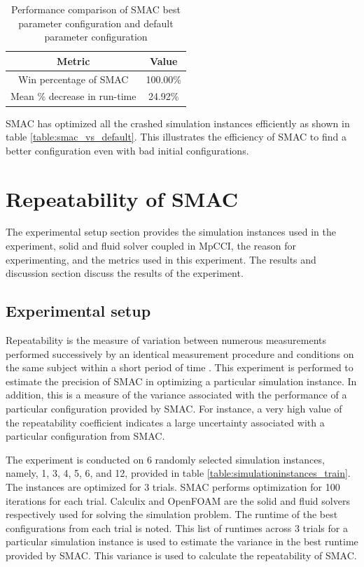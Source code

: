 \begin{table}[]
\centering
\begin{tabular}{|c|c|}
\hline
\textbf{Metric} & \textbf{Value} \\ \hline
Win percentage of SMAC & 100.00\% \\ \hline
Mean \% decrease in run-time & 24.92\% \\ \hline
\end{tabular}
\captionsetup{justification=justified}
\caption[Performance of SMAC best parameter configuration]{Performance comparison of SMAC best parameter configuration and default parameter configuration}
\label{table:experiment1_metrics}
\end{table}

SMAC has optimized all the crashed simulation instances efficiently as shown in table \ref{table:smac_vs_default}. This illustrates the efficiency of SMAC to find a better configuration even with bad initial configurations.

\section{Repeatability of SMAC }
\label{section:repeatability}

The experimental setup section provides the simulation instances used in the experiment, solid and fluid solver coupled in MpCCI, the reason for experimenting, and the metrics used in this experiment. The results and discussion section discuss the results of the experiment.

\subsection{Experimental setup}
Repeatability is the measure of variation between numerous measurements performed successively by an identical measurement procedure and conditions on the same subject within a short period of time \cite{repeatability1}. This experiment is performed to estimate the precision of SMAC in optimizing a particular simulation instance. In addition, this is a measure of the variance associated with the performance of a particular configuration provided by SMAC. For instance, a very high value of the repeatability coefficient indicates a large uncertainty associated with a particular configuration from SMAC. 

The experiment is conducted on 6 randomly selected simulation instances, namely, 1, 3, 4, 5, 6, and 12, provided in table \ref{table:simulationinstances_train}. The instances are optimized for 3 trials. SMAC performs optimization for 100 iterations for each trial. Calculix and OpenFOAM are the solid and fluid solvers respectively used for solving the simulation problem. The runtime of the best configurations from each trial is noted. This list of runtimes across 3 trials for a particular simulation instance is used to estimate the variance in the best runtime provided by SMAC. This variance is used to calculate the repeatability of SMAC.

